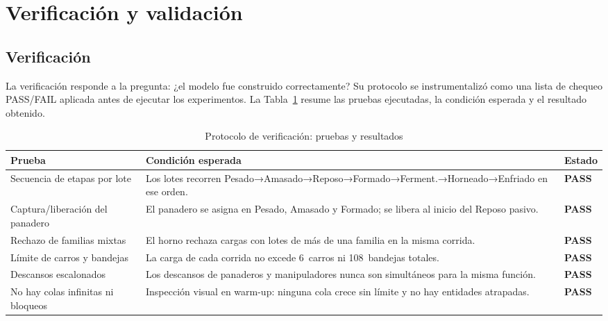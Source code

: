 \documentclass[12pt]{article}
\begin{document}
\newpage
\section{Verificación y validación}

\subsection{Verificación}

La verificación responde a la pregunta: ¿el modelo fue construido correctamente? Su protocolo se instrumentalizó como una lista de chequeo PASS/FAIL aplicada antes de ejecutar los experimentos. La Tabla~\ref{tab:verificacion} resume las pruebas ejecutadas, la condición esperada y el resultado obtenido.

\begin{table}[H]
\centering
\caption{Protocolo de verificación: pruebas y resultados}
\label{tab:verificacion}
\renewcommand{\arraystretch}{1.35}
\begin{tabularx}{\textwidth}{Xll}
\toprule
\rowcolor{tabhead}
\color{white}\textbf{Prueba} &
\color{white}\textbf{Condición esperada} &
\color{white}\textbf{Estado} \\
\midrule
\rowcolor{tabrow} Secuencia de etapas por lote & Los lotes recorren Pesado→Amasado→Reposo→Formado→Ferment.→Horneado→Enfriado en ese orden. & \textcolor{verdeok}{\textbf{PASS}} \\
Captura/liberación del panadero & El panadero se asigna en Pesado, Amasado y Formado; se libera al inicio del Reposo pasivo. & \textcolor{verdeok}{\textbf{PASS}} \\
\rowcolor{tabrow} Rechazo de familias mixtas & El horno rechaza cargas con lotes de más de una familia en la misma corrida. & \textcolor{verdeok}{\textbf{PASS}} \\
Límite de carros y bandejas & La carga de cada corrida no excede 6~carros ni 108~bandejas totales. & \textcolor{verdeok}{\textbf{PASS}} \\
\rowcolor{tabrow} Descansos escalonados & Los descansos de panaderos y manipuladores nunca son simultáneos para la misma función. & \textcolor{verdeok}{\textbf{PASS}} \\
No hay colas infinitas ni bloqueos & Inspección visual en warm-up: ninguna cola crece sin límite y no hay entidades atrapadas. & \textcolor{verdeok}{\textbf{PASS}} \\
\bottomrule
\end{tabularx}
\end{table}
\end{document}
